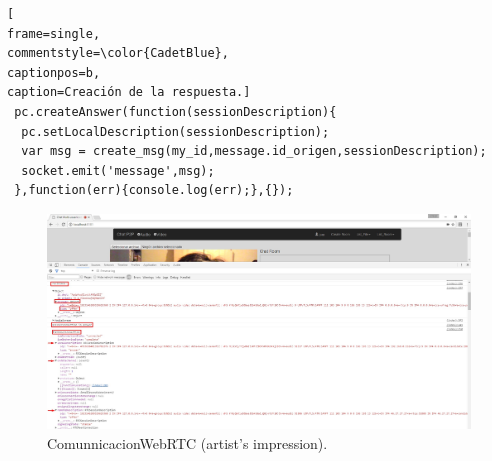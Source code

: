 \begin{lstlisting}[
frame=single,
commentstyle=\color{CadetBlue},
captionpos=b,
caption=Creación de la respuesta.]
 pc.createAnswer(function(sessionDescription){
  pc.setLocalDescription(sessionDescription);
  var msg = create_msg(my_id,message.id_origen,sessionDescription);
  socket.emit('message',msg);
 },function(err){console.log(err);},{});
\end{lstlisting}
\begin{figure}[!h]
\centering
\includegraphics[width=0.7\linewidth]{Figures/AnswerCliente}
\decoRule
\caption[An Electron]{ComunnicacionWebRTC (artist's impression).}
\label{fig:Conexcion_finish}
\end{figure}


